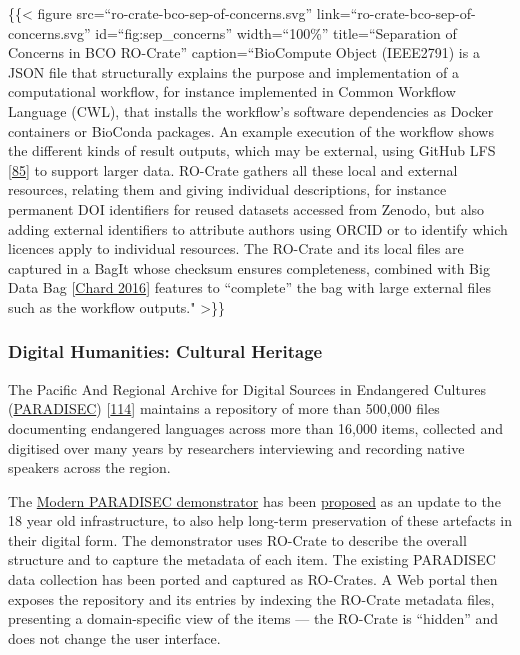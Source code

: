 \{\{\textless{} figure src=``ro-crate-bco-sep-of-concerns.svg''
link=``ro-crate-bco-sep-of-concerns.svg'' id=``fig:sep\_concerns''
width=``100\%'' title=``Separation of Concerns in BCO RO-Crate''
caption=``BioCompute Object (IEEE2791) is a JSON file that structurally
explains the purpose and implementation of a computational workflow, for
instance implemented in Common Workflow Language (CWL), that installs
the workflow's software dependencies as Docker containers or BioConda
packages. An example execution of the workflow shows the different kinds
of result outputs, which may be external, using GitHub LFS
\href{https://docs.github.com/en/repositories/working-with-files/managing-large-files}{{[}85{]}}
to support larger data. RO-Crate gathers all these local and external
resources, relating them and giving individual descriptions, for
instance permanent DOI identifiers for reused datasets accessed from
Zenodo, but also adding external identifiers to attribute authors using
ORCID or to identify which licences apply to individual resources. The
RO-Crate and its local files are captured in a BagIt whose checksum
ensures completeness, combined with Big Data Bag
{[}\href{https://www.research.manchester.ac.uk/portal/files/45989205/bagminid.pdf}{Chard 2016}{]}
features to ``complete'' the bag with large external files such as the
workflow outputs." \textgreater\}\}

\hypertarget{culturalheritage}{%
\subsubsection{Digital Humanities: Cultural
Heritage}\label{culturalheritage}}

The Pacific And Regional Archive for Digital Sources in Endangered
Cultures (\href{https://www.paradisec.org.au/}{PARADISEC})
{[}\href{http://hdl.handle.net/10125/4567}{114}{]} maintains a
repository of more than 500,000 files documenting endangered languages
across more than 16,000 items, collected and digitised over many years
by researchers interviewing and recording native speakers across the
region.

The \href{https://mod.paradisec.org.au/}{Modern PARADISEC demonstrator}
has been
\href{https://arkisto-platform.github.io/case-studies/paradisec/}{proposed}
as an update to the 18 year old infrastructure, to also help long-term
preservation of these artefacts in their digital form. The demonstrator
uses RO-Crate to describe the overall structure and to capture the
metadata of each item. The existing PARADISEC data collection has been
ported and captured as RO-Crates. A Web portal then exposes the
repository and its entries by indexing the RO-Crate metadata files,
presenting a domain-specific view of the items --- the RO-Crate is
``hidden'' and does not change the user interface.

